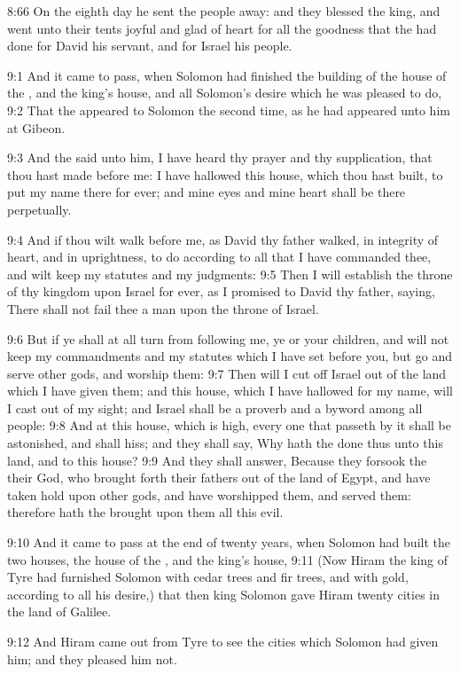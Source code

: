 8:66 On the eighth day he sent the people away: and they blessed the king, and went unto their tents joyful and glad of heart for all the goodness that the \LORD had done for David his servant, and for Israel his people.

9:1 And it came to pass, when Solomon had finished the building of the house of the \LORD, and the king's house, and all Solomon's desire which he was pleased to do, 9:2 That the \LORD appeared to Solomon the second time, as he had appeared unto him at Gibeon.

9:3 And the \LORD said unto him, I have heard thy prayer and thy supplication, that thou hast made before me: I have hallowed this house, which thou hast built, to put my name there for ever; and mine eyes and mine heart shall be there perpetually.

9:4 And if thou wilt walk before me, as David thy father walked, in integrity of heart, and in uprightness, to do according to all that I have commanded thee, and wilt keep my statutes and my judgments: 9:5 Then I will establish the throne of thy kingdom upon Israel for ever, as I promised to David thy father, saying, There shall not fail thee a man upon the throne of Israel.

9:6 But if ye shall at all turn from following me, ye or your children, and will not keep my commandments and my statutes which I have set before you, but go and serve other gods, and worship them: 9:7 Then will I cut off Israel out of the land which I have given them; and this house, which I have hallowed for my name, will I cast out of my sight; and Israel shall be a proverb and a byword among all people: 9:8 And at this house, which is high, every one that passeth by it shall be astonished, and shall hiss; and they shall say, Why hath the \LORD done thus unto this land, and to this house?  9:9 And they shall answer, Because they forsook the \LORD their God, who brought forth their fathers out of the land of Egypt, and have taken hold upon other gods, and have worshipped them, and served them: therefore hath the \LORD brought upon them all this evil.

9:10 And it came to pass at the end of twenty years, when Solomon had built the two houses, the house of the \LORD, and the king's house, 9:11 (Now Hiram the king of Tyre had furnished Solomon with cedar trees and fir trees, and with gold, according to all his desire,) that then king Solomon gave Hiram twenty cities in the land of Galilee.

9:12 And Hiram came out from Tyre to see the cities which Solomon had given him; and they pleased him not.

